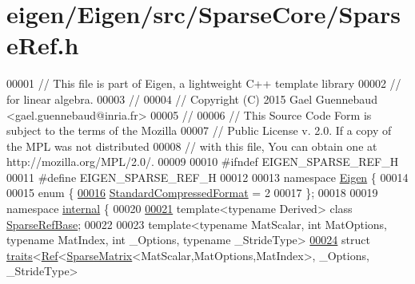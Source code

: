 \hypertarget{eigen_2_eigen_2src_2_sparse_core_2_sparse_ref_8h_source}{}\section{eigen/\+Eigen/src/\+Sparse\+Core/\+Sparse\+Ref.h}
\label{eigen_2_eigen_2src_2_sparse_core_2_sparse_ref_8h_source}

\begin{DoxyCode}
00001 \textcolor{comment}{// This file is part of Eigen, a lightweight C++ template library}
00002 \textcolor{comment}{// for linear algebra.}
00003 \textcolor{comment}{//}
00004 \textcolor{comment}{// Copyright (C) 2015 Gael Guennebaud <gael.guennebaud@inria.fr>}
00005 \textcolor{comment}{//}
00006 \textcolor{comment}{// This Source Code Form is subject to the terms of the Mozilla}
00007 \textcolor{comment}{// Public License v. 2.0. If a copy of the MPL was not distributed}
00008 \textcolor{comment}{// with this file, You can obtain one at http://mozilla.org/MPL/2.0/.}
00009 
00010 \textcolor{preprocessor}{#ifndef EIGEN\_SPARSE\_REF\_H}
00011 \textcolor{preprocessor}{#define EIGEN\_SPARSE\_REF\_H}
00012 
00013 \textcolor{keyword}{namespace }\hyperlink{namespace_eigen}{Eigen} \{
00014 
00015 \textcolor{keyword}{enum} \{
\hyperlink{namespace_eigen_a668ffb0fb66c55c1c98bd35c52df648eaf81fc519ed9cc0ebc6aac69a366086a5}{00016}   \hyperlink{namespace_eigen_a668ffb0fb66c55c1c98bd35c52df648eaf81fc519ed9cc0ebc6aac69a366086a5}{StandardCompressedFormat} = 2 
00017 \};
00018   
00019 \textcolor{keyword}{namespace }\hyperlink{namespaceinternal}{internal} \{
00020 
\hyperlink{class_eigen_1_1internal_1_1_sparse_ref_base}{00021} \textcolor{keyword}{template}<\textcolor{keyword}{typename} Derived> \textcolor{keyword}{class }\hyperlink{class_eigen_1_1internal_1_1_sparse_ref_base}{SparseRefBase};
00022 
00023 \textcolor{keyword}{template}<\textcolor{keyword}{typename} MatScalar, \textcolor{keywordtype}{int} MatOptions, \textcolor{keyword}{typename} MatIndex, \textcolor{keywordtype}{int} \_Options, \textcolor{keyword}{typename} \_Str\textcolor{keywordtype}{id}eType>
\hyperlink{struct_eigen_1_1internal_1_1traits_3_01_ref_3_01_sparse_matrix_3_01_mat_scalar_00_01_mat_optionsa860cad8c30d0eada972a685a49da86f}{00024} \textcolor{keyword}{struct }\hyperlink{struct_eigen_1_1internal_1_1traits}{traits}<\hyperlink{group___core___module_class_eigen_1_1_ref}{Ref}<\hyperlink{group___sparse_core___module_class_eigen_1_1_sparse_matrix}{SparseMatrix}<MatScalar,MatOptions,MatIndex>, \_Options, \_StrideType> 

\end{DoxyCode}
